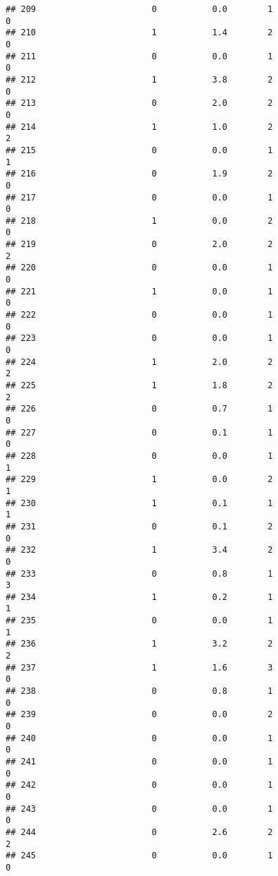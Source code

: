 \documentclass[]{article}
\begin{document}
\begin{verbatim}
## 209                       0           0.0        1                 0
## 210                       1           1.4        2                 0
## 211                       0           0.0        1                 0
## 212                       1           3.8        2                 0
## 213                       0           2.0        2                 0
## 214                       1           1.0        2                 2
## 215                       0           0.0        1                 1
## 216                       0           1.9        2                 0
## 217                       0           0.0        1                 0
## 218                       1           0.0        2                 0
## 219                       0           2.0        2                 2
## 220                       0           0.0        1                 0
## 221                       1           0.0        1                 0
## 222                       0           0.0        1                 0
## 223                       0           0.0        1                 0
## 224                       1           2.0        2                 2
## 225                       1           1.8        2                 2
## 226                       0           0.7        1                 0
## 227                       0           0.1        1                 0
## 228                       0           0.0        1                 1
## 229                       1           0.0        2                 1
## 230                       1           0.1        1                 1
## 231                       0           0.1        2                 0
## 232                       1           3.4        2                 0
## 233                       0           0.8        1                 3
## 234                       1           0.2        1                 1
## 235                       0           0.0        1                 1
## 236                       1           3.2        2                 2
## 237                       1           1.6        3                 0
## 238                       0           0.8        1                 0
## 239                       0           0.0        2                 0
## 240                       0           0.0        1                 0
## 241                       0           0.0        1                 0
## 242                       0           0.0        1                 0
## 243                       0           0.0        1                 0
## 244                       0           2.6        2                 2
## 245                       0           0.0        1                 0

\end{verbatim}
\end{document}

